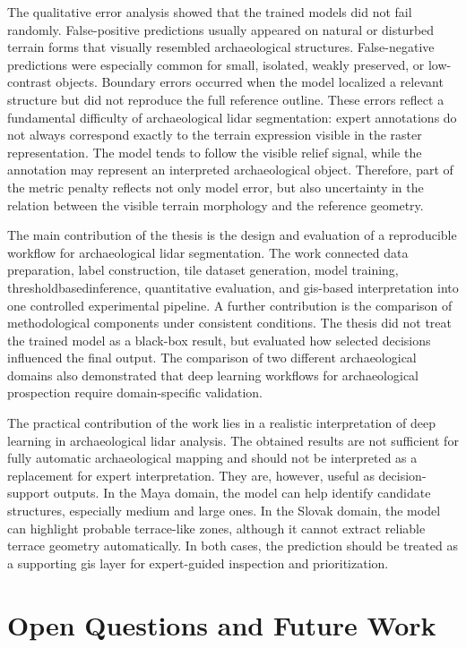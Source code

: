 The qualitative error analysis showed that the trained models did not fail randomly. False-positive predictions usually appeared on natural or disturbed terrain forms that visually resembled archaeological structures. False-negative predictions were especially common for small, isolated, weakly preserved, or low-contrast objects. Boundary errors occurred when the model localized a relevant structure but did not reproduce the full reference outline. These errors reflect a fundamental difficulty of archaeological \gls{lidar} segmentation: expert annotations do not always correspond exactly to the terrain expression visible in the raster representation. The model tends to follow the visible relief signal, while the annotation may represent an interpreted archaeological object. Therefore, part of the metric penalty reflects not only model error, but also uncertainty in the relation between the visible terrain morphology and the reference geometry.

The main contribution of the thesis is the design and evaluation of a reproducible workflow for archaeological \gls{lidar} segmentation. The work connected data preparation, label construction, tile dataset generation, model training, \gls{thresholdbasedinference}, quantitative evaluation, and \gls{gis}-based interpretation into one controlled experimental pipeline. A further contribution is the comparison of methodological components under consistent conditions. The thesis did not treat the trained model as a black-box result, but evaluated how selected decisions influenced the final output. The comparison of two different archaeological domains also demonstrated that deep learning workflows for archaeological prospection require domain-specific validation.

The practical contribution of the work lies in a realistic interpretation of deep learning in archaeological \gls{lidar} analysis. The obtained results are not sufficient for fully automatic archaeological mapping and should not be interpreted as a replacement for expert interpretation. They are, however, useful as decision-support outputs. In the Maya domain, the model can help identify candidate structures, especially medium and large ones. In the Slovak domain, the model can highlight probable terrace-like zones, although it cannot extract reliable terrace geometry automatically. In both cases, the prediction should be treated as a supporting \gls{gis} layer for expert-guided inspection and prioritization.

\section{Open Questions and Future Work}

